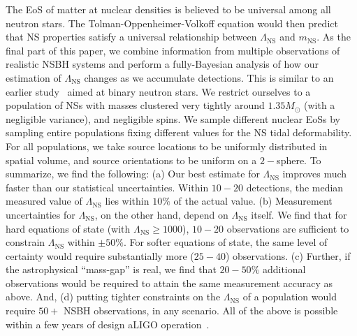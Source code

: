 \documentclass[aps,prd,amsmath,floats,floatfix, twocolumn,
superscriptaddress,nofootinbib,showpacs]{revtex4-1}
\newcommand{\red}{\textcolor{red}}
\newcommand{\prayush}{\textcolor{red!40!black}}
\newcommand{\lambdans}{\Lambda_\mathrm{NS}}
\newcommand{\mns}{m_\mathrm{NS}}
\begin{document}
The EoS of matter at nuclear densities is believed to be universal among all
neutron stars. The Tolman-Oppenheimer-Volkoff equation would then predict that NS
properties satisfy a universal relationship between $\lambdans$ and $\mns$. As
the final part of
this paper, we combine information from multiple observations of realistic NSBH
systems and perform a fully-Bayesian analysis of how our estimation of
$\lambdans$ changes as we accumulate detections. This is similar to an earlier
study~\cite{DelPozzo:13} aimed at binary neutron stars.
We restrict ourselves to a population of NSs with masses clustered very tightly
around $1.35M_\odot$ (with a negligible variance), and negligible spins. We
sample different nuclear EoSs by sampling entire populations fixing different
values for the NS tidal deformability.
For all populations, we take source locations to be uniformly distributed in
spatial volume, and source orientations to be uniform on a $2-$sphere. To
summarize, we find the following:
% 
(a) Our best estimate for $\lambdans$ improves much faster than our statistical
uncertainties. Within $10-20$ detections, the median measured value of
$\lambdans$ lies within $10\%$ of the actual value.
(b) Measurement uncertainties for $\lambdans$, on the other hand, depend on
$\lambdans$ itself. We find that for hard equations of state (with 
$\lambdans\geq 1000$), $10-20$ observations are sufficient to constrain
$\lambdans$ within $\pm 50\%$. For softer equations of state, the same level
of certainty would require substantially more ($25-40$) observations.
% 
(c) Further, if the astrophysical ``mass-gap'' is real, we find that $20-50\%$
additional observations would be required to attain the same measurement
accuracy as above. And, (d) putting tighter constraints on the $\lambdans$ of a
population would require $50+$ NSBH observations, in any scenario.
% 
All of the above is possible within a few years of design
aLIGO operation~\cite{Abadie:2010cfa}.
\end{document}
